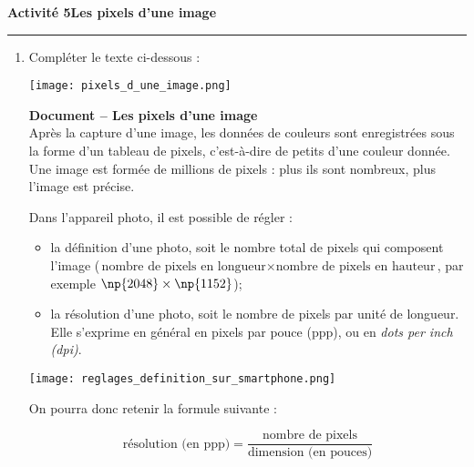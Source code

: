 \documentclass[a4paper]{article}
\newlength{\stextwidth} %
\newcommand{\guess}[1]{\ifthenelse{\boolean{reveal}}{{\color{red}#1}}{\settowidth{\stextwidth}{#1}\makebox[\stextwidth]{\dotfill}}}
\begin{document}
\pagebreak

\noindent\textbf{Activité 5}\hfill{}\textbf{Les pixels d'une image}
\smallskip
\hrule
\medskip

\begin{enumerate}
  \item Compléter le texte ci-dessous :
    \begin{multicols}{2}

      \begin{center}
	\texttt{[image: pixels\_d\_une\_image.png]}
      \end{center}

      \vspace*{12mm}

      \textbf{Document -- Les pixels d'une image}\\
      Après la capture d'une image, les données de couleurs sont enregistrées sous la forme d'un \og{}tableau de pixels\fg{}, c'est-à-dire de petits \guess{carrés} d'une couleur donnée. Une image est formée de millions de pixels : plus ils sont nombreux, plus l'image est précise.
    \end{multicols}

    \begin{multicols}{2}
      \vspace*{5mm}
    Dans l'appareil photo, il est possible de régler :
    \begin{itemize}
      \item la {\color{red}définition d'une photo}, soit le nombre total de pixels qui composent l'image ($\text{nombre de pixels en longueur}\times\text{nombre de pixels en hauteur}$, par exemple $\np{2048}\times\np{1152}$);
      \item la {\color{red}résolution d'une photo}, soit le nombre de pixels par unité de longueur. Elle s'exprime en général en {\color{blue}pixels par pouce (ppp)}, ou en {\color{blue}\textit{dots per inch (dpi)}}.
    \end{itemize}
    \vspace*{10mm}

    \begin{center}
      \texttt{[image: reglages\_definition\_sur\_smartphone.png]}
    \end{center}
    \end{multicols}

    On pourra donc retenir la formule suivante :

    \[\text{résolution (en ppp)} = \dfrac{\text{nombre de pixels}}{\text{dimension (en pouces)}}\]


\end{enumerate}
\end{document}
